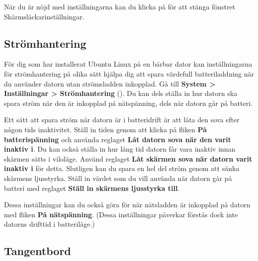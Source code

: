 \documentclass[a4paper,final]{memoir} %
\begin{document}
När du är nöjd med inställningarna kan du klicka på \xstang{} för att stänga fönstret Skärmsläckarinställningar.


\subsection{Strömhantering}


För dig som har installerat Ubuntu Linux på en bärbar dator kan inställningarna för strömhantering på olika sätt hjälpa dig att spara värdefull batteriladdning när du använder datorn utan strömsladden inkopplad. Gå till \textbf{System \textgreater{} Inställningar \textgreater{} Strömhantering} (). Du kan dels ställa in hur datorn ska spara ström när den är inkopplad på nätspänning, dels när datorn går på batteri.


Ett sätt att spara ström när datorn är i batteridrift är att låta den sova efter någon tids inaktivitet. Ställ in tiden genom att klicka på fliken \textbf{På batterispänning} och använda reglaget \textbf{Låt datorn sova när den varit inaktiv i}. Du kan också ställa in hur lång tid datorn får vara inaktiv innan skärmen sätts i viloläge. Använd reglaget \textbf{Låt skärmen sova när datorn varit inaktiv i} för detta. Slutligen kan du spara en hel del ström genom att sänka skärmens ljusstyrka. Ställ in värdet som du vill använda när datorn går på batteri med reglaget \textbf{Ställ in skärmens ljusstyrka till}.

Dessa inställningar kan du också göra för när nätsladden är inkopplad på datorn med fliken \textbf{På nätspänning}. (Dessa inställningar påverkar förstås dock inte datorns drifttid i batteriläge.)


\subsection{Tangentbord}\label{tangentbordslayout}

\end{document}
